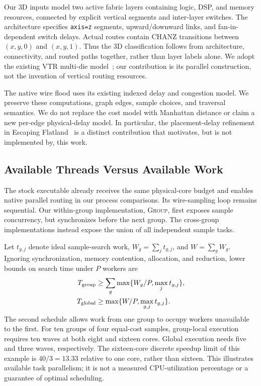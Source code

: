 \documentclass[conference,10pt,letterpaper]{IEEEtran}
\newcommand{\Group}{\textsc{Group}}
\begin{document}
Our 3D inputs model two active fabric layers containing logic, DSP, and memory resources, connected by explicit vertical segments and inter-layer switches. The architecture specifies \texttt{axis=z} segments, upward/downward links, and fan-in-dependent switch delays. Actual routes contain CHANZ transitions between $(x,y,0)$ and $(x,y,1)$. Thus the 3D classification follows from architecture, connectivity, and routed paths together, rather than layer labels alone. We adopt the existing VTR multi-die model~\cite{third_dimension,multidie}; our contribution is its parallel construction, not the invention of vertical routing resources.

The native wire flood uses its existing indexed delay and congestion model. We preserve these computations, graph edges, sample choices, and traversal semantics. We do not replace the cost model with Manhattan distance or claim a new per-edge physical-delay model. In particular, the placement-delay refinement in Escaping Flatland~\cite{flatland} is a distinct contribution that motivates, but is not implemented by, this work.

\subsection{Available Threads Versus Available Work}
The stock executable already receives the same physical-core budget and enables native parallel routing in our process comparisons. Its wire-sampling loop remains sequential. Our within-group implementation, \Group, first exposes sample concurrency, but synchronizes before the next group. The cross-group implementations instead expose the union of all independent sample tasks.

Let $t_{g,j}$ denote ideal sample-search work, $W_g=\sum_jt_{g,j}$, and $W=\sum_gW_g$. Ignoring synchronization, memory contention, allocation, and reduction, lower bounds on search time under $P$ workers are
\begin{align}
 T_{\rm group}&\geq\sum_g\max\{W_g/P,\max_jt_{g,j}\},\\
 T_{\rm global}&\geq\max\{W/P,\max_{g,j}t_{g,j}\}.
 \label{eq:width}
\end{align}
The second schedule allows work from one group to occupy workers unavailable to the first. For ten groups of four equal-cost samples, group-local execution requires ten waves at both eight and sixteen cores. Global execution needs five and three waves, respectively. The sixteen-core discrete speedup limit of this example is $40/3=13.33$ relative to one core, rather than sixteen. This illustrates available task parallelism; it is not a measured CPU-utilization percentage or a guarantee of optimal scheduling.
\end{document}
